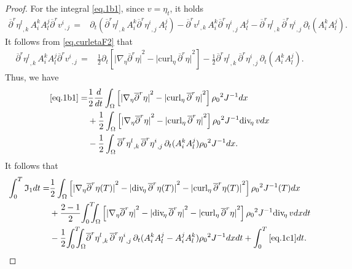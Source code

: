 \documentclass[12pt,twoside,reqno]{amsart}
\numberwithin{equation}{section}
\theoremstyle{definition}
\theoremstyle{remark}
\begin{document}
\begin{proof}
For the integral \eqref{eq.1b1}, since $v=\eta_t$, it holds
\begin{align*}
{\overline{\partial}}^r{{{\eta^l}}_{,{k}}\,}A_i^kA_l^j {\overline{\partial}}^r {{{v^i}}_{,{j}}\,}=&{\partial}_t({\overline{\partial}}^r{{{\eta^l}}_{,{k}}\,}A_i^k {\overline{\partial}}^r {{{\eta^i}}_{,{j}}\,}A_l^j)-{\overline{\partial}}^r{{{v^l}}_{,{k}}\,}A_i^k {\overline{\partial}}^r {{{\eta^i}}_{,{j}}\,}A_l^j-{\overline{\partial}}^r{{{\eta^l}}_{,{k}}\,} {\overline{\partial}}^r {{{\eta^i}}_{,{j}}\,}{\partial}_t(A_i^k A_l^j).
\end{align*}
It follows from \eqref{eq.curletaF2} that
\begin{align}\label{eq.etavaa1}
  {\overline{\partial}}^r{{{\eta^l}}_{,{k}}\,}A_i^kA_l^j {\overline{\partial}}^r {{{v^i}}_{,{j}}\,}=&\frac{1}{2}{\partial}_t\left[{\vert{{\nabla}_\eta {\overline{\partial}}^r\eta}\vert}^2-{\vert{{\mathrm{curl}_\eta\,} {\overline{\partial}}^r \eta}\vert}^2\right]-\frac{1}{2}{\overline{\partial}}^r{{{\eta^l}}_{,{k}}\,} {\overline{\partial}}^r {{{\eta^i}}_{,{j}}\,}{\partial}_t(A_i^k A_l^j).
\end{align}
Thus, we have
\begin{align*}
  \eqref{eq.1b1}=&\frac{1}{2}\frac{d}{dt}\int_\Omega \left[{\vert{{\nabla}_\eta {\overline{\partial}}^r\eta}\vert}^2-{\vert{{\mathrm{curl}_\eta\,} {\overline{\partial}}^r \eta}\vert}^2\right]{\rho_0}^2  J^{-1}dx\\
  &+\frac1{2}\int_\Omega \left[{\vert{{\nabla}_\eta {\overline{\partial}}^r\eta}\vert}^2-{\vert{{\mathrm{curl}_\eta\,} {\overline{\partial}}^r \eta}\vert}^2\right]{\rho_0}^2 J^{-1}{\mathrm{div}_{\!\eta}\,} vdx\\
  &-\frac{1}{2}\int_\Omega {\overline{\partial}}^r{{{\eta^l}}_{,{k}}\,} {\overline{\partial}}^r {{{\eta^i}}_{,{j}}\,}{\partial}_t(A_i^k A_l^j){\rho_0}^2  J^{-1}dx.
\end{align*}
It follows that
\begin{align*}
  \int_0^T{\mathfrak{I}}_1dt=&\frac{1}{2}\int_\Omega \left[{\vert{{\nabla}_\eta {\overline{\partial}}^r\eta(T)}\vert}^2-{\vert{{\mathrm{div}_{\!\eta}\,} {\overline{\partial}}^r \eta(T)}\vert}^2-{\vert{{\mathrm{curl}_\eta\,} {\overline{\partial}}^r \eta(T)}\vert}^2\right]{\rho_0}^2  J^{-1}(T)dx\\
&+\frac{2-1 }{2}{\int_0^T\!\!\!\!\int_\Omega }  \left[{\vert{{\nabla}_\eta {\overline{\partial}}^r\eta}\vert}^2-{\vert{{\mathrm{div}_{\!\eta}\,} {\overline{\partial}}^r \eta}\vert}^2-{\vert{{\mathrm{curl}_\eta\,} {\overline{\partial}}^r \eta}\vert}^2\right]{\rho_0}^2  J^{-1}{\mathrm{div}_{\!\eta}\,} vdxdt\\
  &-\frac{1}{2}{\int_0^T\!\!\!\!\int_\Omega }  {\overline{\partial}}^r{{{\eta^l}}_{,{k}}\,} {\overline{\partial}}^r {{{\eta^i}}_{,{j}}\,}{\partial}_t(A_i^k A_l^j-A_i^jA_l^k){\rho_0}^2  J^{-1}dxdt +\int_0^T\eqref{eq.1c1}dt.
\end{align*}


\end{proof}
\end{document}
